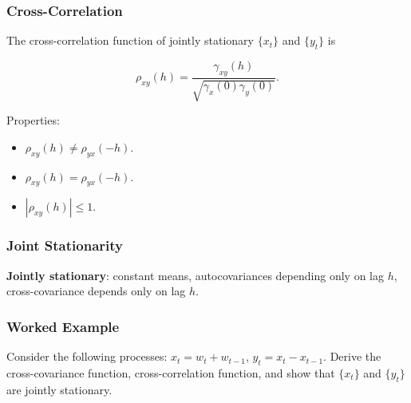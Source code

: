 \documentclass[%
xcolor=pdftex]{beamer}
\begin{document}
\begin{frame}
\frametitle{Cross-Correlation}

The cross-correlation function of jointly stationary $\{x_t\}$ and $\{y_t\}$ is

\begin{equation} \label{eq:cor}
\rho_{xy}(h) = \frac{\gamma_{xy}(h)}{\sqrt{\gamma_x(0) \gamma_y(0)}}.
\end{equation}

Properties:
\begin{itemize}
\item $\rho_{xy}(h) \neq \rho_{yx}(-h)$.
\item $\rho_{xy}(h) = \rho_{yx}(-h)$.
\item $|\rho_{xy}(h)| \leq 1$.
\end{itemize}

\end{frame}

\begin{frame}
\frametitle{Joint Stationarity}

\textbf{Jointly stationary}: constant means, autocovariances depending only on lag $h$, cross-covariance depends only on lag $h$.\\

\vspace{5mm}


\end{frame}

\begin{frame}
\frametitle{Worked Example}

Consider the following processes: $x_t = w_t + w_{t-1}$, $y_t = x_t - x_{t-1}$. Derive the cross-covariance function, cross-correlation function, and show that $\{x_t\}$ and $\{y_t\}$ are jointly stationary.\\

\vspace{50mm}

\end{frame}
\end{document}
